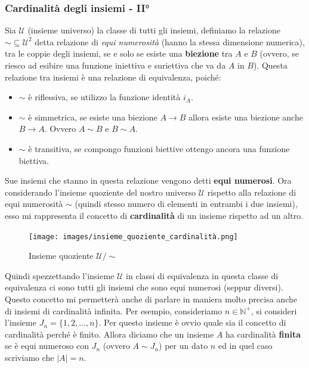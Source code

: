 \documentclass{article}
\begin{document}
\subsubsection{Cardinalità degli insiemi - II°}
Sia $\mathcal{U}$ (insieme universo) la classe di tutti gli insiemi,
definiamo la relazione $\sim\subseteq\mathcal{U}^2$ detta relazione
di \textit{equi numerosità} (hanno la stessa dimensione numerica), tra le coppie degli insiemi, se e solo se esiste
una \textbf{biezione} tra $A$ e $B$ (ovvero, se riesco ad esibire una funzione
iniettiva e suriettiva che va da $A$ in $B$).
Questa relazione tra insiemi è una relazione di equivalenza, poiché:
\begin{itemize}
    \item $\sim$ è riflessiva, se utilizzo la funzione identità $i_A$.
    \item $\sim$ è simmetrica, se esiste una biezione $A\rightarrow B$ allora
          esiste una biezione anche $B\rightarrow A$. Ovvero $A\sim B$ e $B\sim A$.
    \item $\sim$ è transitiva, se compongo funzioni biettive ottengo ancora una
          funzione biettiva.
\end{itemize}

Sue insiemi che stanno in questa relazione vengono detti \textbf{equi numerosi}. Ora
considerando l'insieme quoziente del nostro universo $\mathcal{U}$ rispetto alla
relazione di equi numerosità $\sim$ (quindi stesso numero di elementi in entrambi
i due insiemi), esso mi rappresenta il concetto di \textbf{cardinalità}
di un insieme rispetto ad un altro.
\begin{figure}[H]
    \centering
    \texttt{[image: images/insieme\_quoziente\_cardinalità.png]}
    \caption{Insieme quoziente $\mathcal{U} / \sim$}
\end{figure}
Quindi spezzettando l'insieme $\mathcal{U}$ in classi di equivalenza
in questa classe di equivalenza ci sono tutti gli insiemi
che sono equi numerosi (seppur diversi).
Questo concetto mi permetterà anche di parlare in maniera molto precisa anche di
insiemi di cardinalità infinita.
\newline
\newline
Per esempio, consideriamo $n\in\mathbb{N}^+$, si consideri l'insieme $J_n=\{1,2,...,n\}$. Per questo
insieme è ovvio quale sia il concetto di cardinalità perché è finito.
Allora diciamo che un insieme $A$ ha cardinalità \textbf{finita} se è equi
numeroso con $J_n$ (ovvero $A\sim J_n$) per un dato $n$ ed in quel caso scriviamo che $|A|=n$.
\end{document}
